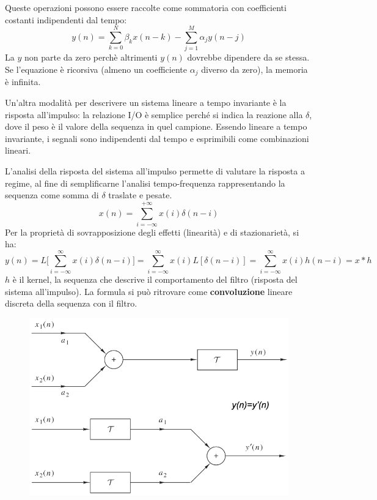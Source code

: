 Queste operazioni possono essere raccolte come sommatoria con coefficienti costanti indipendenti dal tempo:
$$y(n) = \sum_{k=0}^{N} \beta_kx(n - k) - \sum_{j=1}^{M} \alpha_jy(n - j)$$
La $y$ non parte da zero perchè altrimenti $y(n)$ dovrebbe dipendere da se stessa. Se l'equazione è ricorsiva (almeno un coefficiente $\alpha_j$ diverso da zero), la memoria è infinita.

Un'altra modalità per descrivere un sistema lineare a tempo invariante è la risposta all'impulso: la relazione I/O è semplice perché si indica la reazione alla $\delta$, dove il peso è il valore della sequenza in quel campione. Essendo lineare a tempo invariante, i segnali sono indipendenti dal tempo e esprimibili come combinazioni lineari. 

L'analisi della risposta del sistema all'impulso permette di valutare la risposta a regime, al fine di semplificarne l'analisi tempo-frequenza rappresentando la sequenza come somma di $\delta$ traslate e pesate.
$$x(n) = \sum_{i=-\infty}^{+\infty}x(i)\delta(n-i)$$
Per la proprietà di sovrapposizione degli effetti (linearità) e di stazionarietà, si ha:
$$y(n) = L\Big[\sum_{i=-\infty}^{\infty}x(i)\delta(n - i)\Big] = \sum_{i=-\infty}^{\infty}x(i)L[\delta(n - i)] = \sum_{i=-\infty}^{\infty}x(i)h(n - i) = x * h$$
$h$ è il kernel, la sequenza che descrive il comportamento del filtro (risposta del sistema all'impulso). La formula si può ritrovare come \textbf{convoluzione} lineare discreta della sequenza con il filtro.

\begin{figure}[h]
	\centering
	\includegraphics[scale=0.35]{Lezioni/Immagini/sovrapposizione}
\end{figure}

